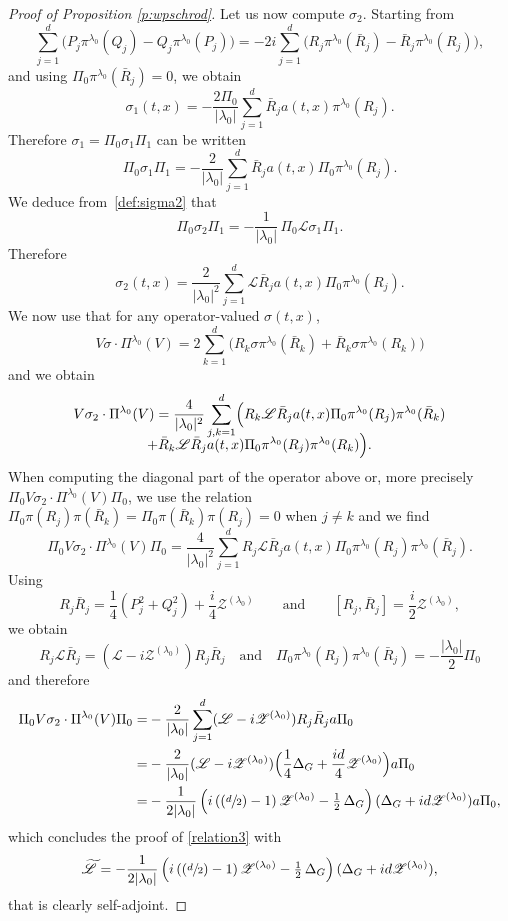 \documentclass[10pt]{amsart}
\let\mathcal\mathscr
\newcommand{\Psfrac}[2]{(\sfrac{#1}{#2})}
\theoremstyle{plain}
\theoremstyle{definition}
\begin{document}
\begin{proof}[Proof of Proposition \ref{p:wpschrod}]
Let us now compute $\sigma_2$. Starting from
\[
\sum_{j=1}^d\bigl(P_j\pi^{\lambda_0}(Q_j)-Q_j \pi^{\lambda_0}(P_j)\bigr)
= -2 i \sum_{j=1}^d \bigl(R_j\pi^{\lambda_0}(\bar R_j)-\bar R_j \pi^{\lambda_0}(R_j)\bigr),
\]
and using $\Pi_0 \pi^{\lambda_0}(\bar R_j)=0$, we obtain
\[
\sigma_1(t,x)=-\frac{2\Pi_0}{|\lambda_0|} \sum_{j=1}^d \bar R_j a(t,x)\pi^{\lambda_0}(R_j).
\]
Therefore $\sigma_1=\Pi_0 \sigma_1 \Pi_1$ can be written
\[
\Pi_0 \sigma_1 \Pi_{1} = -\frac 2{|\lambda_0|} \sum_{j=1}^d \bar R_j a(t,x)\Pi_0\pi^{\lambda_0}(R_j).
\]
We deduce from~\eqref{def:sigma2} that
\[
\Pi_0 \sigma_2 \Pi_{1} =- \frac{1}{|\lambda_0|}\, \Pi_0\mathcal{L} \sigma_1\Pi_{1}.
\]
Therefore
\[
\sigma_2(t,x)= \frac {2} {|\lambda_0|^2 } \sum_{j=1}^d \mathcal{L} \bar R_j a(t,x)\Pi_0\pi^{\lambda_0}(R_j).
\]
We now use that for any operator-valued $\sigma(t,x)$,
\[
V\sigma\cdot \Pi^{\lambda_0}(V)= 2\sum_{k=1}^d \bigl(R_k\sigma\pi^{\lambda_0}(\bar R_k)+\bar R_k \sigma\pi^{\lambda_0}(R_k)\bigr)
\]
and we obtain
\begin{multline*}
V\sigma_2 \cdot \Pi^{\lambda_0}(V)=
\frac {4}{|\lambda_0|^2 } \sum_{j,k=1}^d \Bigl(R_k \mathcal{L} \bar R_j a(t,x)\Pi_0\pi^{\lambda_0}(R_j)\pi^{\lambda_0}(\bar R_k)\\[-8pt]
+ \bar R_k \mathcal{L} \bar R_j a(t,x)\Pi_0\pi^{\lambda_0}(R_j)\pi^{\lambda_0}(R_k)\Bigr).
\end{multline*}
When computing the diagonal part of the operator above or, more precisely $\Pi_0 V\sigma_2 \cdot \Pi^{\lambda_0}(V)\Pi_0$, we use the relation $\Pi_0\pi(R_j) \pi(\bar R_k) =\Pi_0\pi(\bar R_k) \pi(R_j)=0$ when $j\not=k$ and we find
\[
\Pi_0 V\sigma_2 \cdot \Pi^{\lambda_0}(V)\Pi_0=
\frac {4}{|\lambda_0|^2 } \sum_{j=1}^d R_j \mathcal{L} \bar R_j a(t,x)\Pi_0\pi^{\lambda_0}(R_j)\pi^{\lambda_0}(\bar R_j).
\]
Using
\[
R_j\bar R_j=\frac 14 (P_j^2+Q_j^2) +\frac i 4 \mathcal Z^{(\lambda_0)}
\quad \quad \text{and}\quad \quad [R_j,\bar R_j]=\frac{i}{2}\mathcal Z^{(\lambda_0)},
\]
we obtain
\[
R_j\mathcal{L}\bar R_j= (\mathcal L -i\mathcal Z^{(\lambda_0)}) R_j\bar R_j
\quad \text{and} \quad \Pi_0\pi^{\lambda_0}(R_j)\pi^{\lambda_0}(\bar R_j)=
-\frac{|\lambda_0|} 2 \Pi_0
\]
and therefore
\begin{align*}
\Pi_0 V\sigma_2 \cdot \Pi^{\lambda_0}(V)\Pi_0=& -\frac 2 {|\lambda_0|} \sum_{j=1}^d (\mathcal L -i\mathcal Z^{(\lambda_0)})R_j \bar R_j a\Pi_0\\
=& -\frac 2 {|\lambda_0|} (\mathcal L -i\mathcal Z^{(\lambda_0)})\Bigl(\frac 14 \Delta_G + \frac {id}4 \mathcal Z^{(\lambda_0)}\Bigr) a \Pi_0\\
=& -\frac 1 {2|\lambda_0|}\left(i\left(\Psfrac d2 -1\right) \mathcal Z^{(\lambda_0)}-\tfrac 12\, \Delta_G\right) (\Delta_G +id \mathcal Z^{(\lambda_0)})a \Pi_0,
\end{align*}
which concludes the proof of \eqref{relation3} with
\[
\widetilde{\mathcal L}= -\frac 1 {2|\lambda_0|}\left(i\left(\Psfrac d2 -1\right) \mathcal Z^{(\lambda_0)}-\tfrac 12\, \Delta_G\right) (\Delta_G +id \mathcal Z^{(\lambda_0)}),
\]
that is clearly self-adjoint.
\end{proof}
\end{document}
